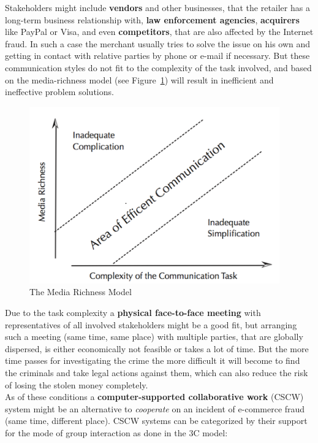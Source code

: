 Stakeholders might include \textbf{vendors} and other businesses, that the retailer has a long-term business relationship with, \textbf{law enforcement agencies}, \textbf{acquirers} like PayPal or Visa,
and even \textbf{competitors}, that are also affected by the Internet fraud. In such a case the merchant usually tries to solve the issue on his own and getting in contact with relative parties by phone or e-mail
if necessary. But these communication styles do not fit to the complexity of the task involved, and based on the media-richness model (see Figure~\ref{fig:images_media_richness_model}) will result in inefficient and ineffective problem solutions.

\begin{figure}[H]
	\centering
		\includegraphics[height=3in]{images/media-richness-model.png}
	\caption{The Media Richness Model \citep{Rice1992}}
\label{fig:images_media_richness_model}
\end{figure}

Due to the task complexity a \textbf{physical face-to-face meeting} with representatives of all involved stakeholders might be a good fit, but arranging such a meeting (same time, same place) with multiple parties,
that are globally dispersed, is either economically not feasible or takes a lot of time. But the more time passes for investigating the crime the more difficult it will become to find the criminals and take legal actions against them,
which can also reduce the risk of losing the stolen money completely. \\

As of these conditions a \textbf{computer-supported collaborative work} (CSCW) system might be an alternative to \textit{cooperate} on an incident of e-commerce fraud (same time, different place).
CSCW systems can be categorized by their support for the mode of group interaction as done in the 3C model:

